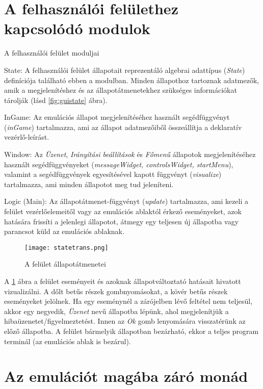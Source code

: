 \section{A felhasználói felülethez kapcsolódó modulok}

\begin{compactdesc}
	\item[A felhasználói felület moduljai]
	\item[State:]
	A felhasználói felület állapotait reprezentáló algebrai adattípus (\emph{State}) definíciója található ebben a modulban. Minden állapothoz tartoznak adatmezők, amik a megjelenítéshez és az állapotátmenetekhez szükséges információkat tárolják (lásd \ref{fig:guistate} ábra).
	\item[InGame:]
	Az emulációs állapot megjelenítéséhez használt segédfüggvényt (\emph{inGame}) tartalmazza, ami az állapot adatmezőiből összeállítja a deklaratív vezérlő-leírást.
	\item[Window:]
	Az \emph{Üzenet}, \emph{Irányítási beállítások} és \emph{Főmenű} állapotok megjelenítéséhez használt segédfüggvényeket (\emph{messageWidget, controlsWidget, startMenu}), valamint a segédfüggvények egyesítésével kapott függvényt (\emph{visualize}) tartalmazza, ami minden állapotot meg tud jeleníteni.
	\item[Logic (Main):]
	Az állapotátmenet-függvényt (\emph{update}) tartalmazza, ami kezeli a felület vezérlőelemeitől vagy az emulációs ablaktól érkező eseményeket, azok hatására frissíti a jelenlegi állapotot, átmegy egy teljesen új állapotba vagy parancsot küld az emulációs ablaknak.
\end{compactdesc}

\begin{figure}[H]
	\centering
	\texttt{[image: statetrans.png]}
	\caption{A felület állapotátmenetei}
	\label{fig:states}
\end{figure}

A \ref{fig:states} ábra a felület eseményeit és azoknak állapotváltoztató hatásait hivatott vizualizálni. A dőlt betűs részek gombnyomásokat, a kövér betűs részek eseményeket jelölnek. Ha egy eseménynél a zárójelben lévő feltétel nem teljesül, akkor egy negyedik, \emph{Üzenet} nevű állapotba lépünk, ahol megjelenítjük a hibaüzenetet/figyelmeztetést. Innen az \emph{Ok} gomb lenyomására visszatérünk az előző állapotba. A felület bármelyik állapotban bezárható, ekkor a teljes program terminál (az emulációs ablak is bezárul).

\section{Az emulációt magába záró monád}

